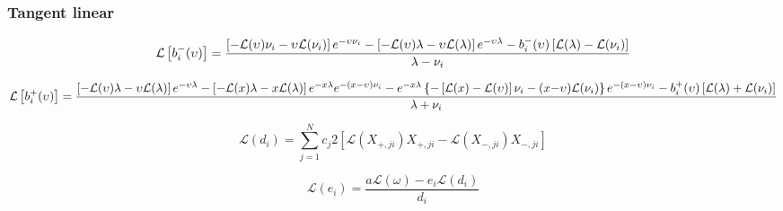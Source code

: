 %
\subsubsection{Tangent linear}
\label{sec:solar_source-local_solar_source-greens_function_tangent_linear}

\begin{adjustwidth}{-1in}{-1in}
\begin{equation}
\footnotesize
\mathcal{L}\left[b^{-}_{i}(\upsilon)\right] = \frac{\left[-\mathcal{L}(\upsilon)\nu_{i} - \upsilon\mathcal{L}(\nu_{i})\right]e^{-\upsilon\nu_{i}} - \left[-\mathcal{L}(\upsilon)\lambda - \upsilon\mathcal{L}(\lambda)\right]e^{-\upsilon\lambda} - b^{-}_{i}(\upsilon) \left[\mathcal{L}(\lambda) - \mathcal{L}(\nu_{i})\right]}{\lambda - \nu_{i}}
\label{eq:solar_source-local_solar_source-greens_function_tangent_linear-b_m_l}
\end{equation}
\end{adjustwidth}

\begin{adjustwidth}{-2in}{-2in}
\begin{equation}
\footnotesize
\mathcal{L}\left[b^{+}_{i}(\upsilon)\right] = \frac{\left[-\mathcal{L}(\upsilon)\lambda - \upsilon\mathcal{L}(\lambda)\right]e^{-\upsilon\lambda} - \left[-\mathcal{L}(x)\lambda - x\mathcal{L}(\lambda)\right]e^{-x\lambda}e^{-(x - \upsilon)\nu_{i}} - e^{-x\lambda}\left\{-\left[\mathcal{L}(x) - \mathcal{L}(\upsilon)\right]\nu_{i} - (x\mathcal - \upsilon)\mathcal{L}(\nu_{i})\right\}e^{-(x - \upsilon)\nu_{i}} - b^{+}_{i}(\upsilon) \left[\mathcal{L}(\lambda) + \mathcal{L}(\nu_{i})\right]}{\lambda + \nu_{i}}
\label{eq:solar_source-local_solar_source-greens_function_tangent_linear-b_p_l}
\end{equation}
\end{adjustwidth}

\begin{equation}
\mathcal{L}(d_{i}) = \sum^{N}_{j = 1} c_{j} 2\left[\mathcal{L}(X_{+,ji})X_{+,ji} - \mathcal{L}(X_{-,ji})X_{-,ji}\right]
\label{eq:solar_source-local_solar_source-greens_function_tangent_linear-d_l}
\end{equation}

\begin{equation}
\mathcal{L}(e_{i}) = \frac{a \mathcal{L}(\omega) - e_{i} \mathcal{L}(d_{i})}{d_{i}}
\label{eq:solar_source-local_solar_source-greens_function_tangent_linear-e_l}
\end{equation}

